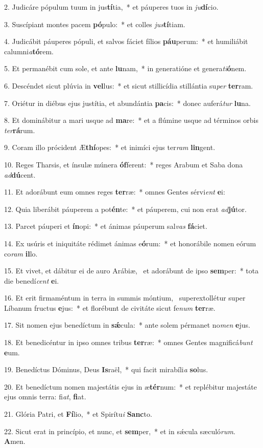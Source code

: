 2. Judicáre pópulum tuum in jus\textbf{tí}tia,~*  et páuperes tuos in \textit{ju}\textbf{dí}cio.\

3. Suscípiant montes pacem \textbf{pó}pulo:~*  et colles \textit{jus}\textbf{tí}tiam.\

4. Judicábit páuperes pópuli, et salvos fáciet fílios \textbf{páu}perum:~*  et humiliábit calumni\textit{a}\textbf{tó}rem.\

5. Et permanébit cum sole, et ante \textbf{lu}nam,~*  in generatióne et genera\textit{ti}\textbf{ó}nem.\

6. Descéndet sicut plúvia in \textbf{vel}lus:~*  et sicut stillicídia stillántia su\textit{per} \textbf{ter}ram.\

7. Oriétur in diébus ejus justítia, et abundántia \textbf{pa}cis:~*  donec auferá\textit{tur} \textbf{lu}na.\

8. Et dominábitur a mari usque ad \textbf{ma}re:~*  et a flúmine usque ad términos orbis \textit{ter}\textbf{rá}rum.\

9. Coram illo prócident Æ\textbf{thí}opes:~*  et inimíci ejus ter\textit{ram} \textbf{lin}gent.\

10. Reges Tharsis, et ínsulæ múnera \textbf{óf}ferent:~*  reges Arabum et Saba dona \textit{ad}\textbf{dú}cent.\

11. Et adorábunt eum omnes reges \textbf{ter}ræ:~*  omnes Gentes sérvi\textit{ent} \textbf{e}i:\

12. Quia liberábit páuperem a pot\textbf{én}te:~*  et páuperem, cui non erat \textit{ad}\textbf{jú}tor.\

13. Parcet páuperi et \textbf{ín}opi:~*  et ánimas páuperum sal\textit{vas} \textbf{fá}ciet.\

14. Ex usúris et iniquitáte rédimet ánimas e\textbf{ó}rum:~*  et honorábile nomen eórum co\textit{ram} \textbf{il}lo.\

15. Et vivet, et dábitur ei de auro Arábiæ, \dag\  et adorábunt de ipso \textbf{sem}per:~*  tota die benedí\textit{cent} \textbf{e}i.\

16. Et erit firmaméntum in terra in summis móntium, \dag\  superextollétur super Líbanum fructus \textbf{e}jus:~*  et florébunt de civitáte sicut fe\textit{num} \textbf{ter}ræ.\

17. Sit nomen ejus benedíctum in \textbf{sǽ}cula:~*  ante solem pérmanet no\textit{men} \textbf{e}jus.\

18. Et benedicéntur in ipso omnes tribus \textbf{ter}ræ:~*  omnes Gentes magnificá\textit{bunt} \textbf{e}um.\

19. Benedíctus Dóminus, Deus \textbf{Is}raël,~*  qui facit mirabíli\textit{a} \textbf{so}lus.\

20. Et benedíctum nomen majestátis ejus in æ\textbf{tér}num:~*  et replébitur majestáte ejus omnis terra: fi\textit{at}, \textbf{fi}at.\

21. Glória Patri, et \textbf{Fí}lio,~*  et Spirítu\textit{i} \textbf{Sanc}to.\

22. Sicut erat in princípio, et nunc, et \textbf{sem}per,~*  et in sǽcula sæculó\textit{rum}. \textbf{A}men.\

